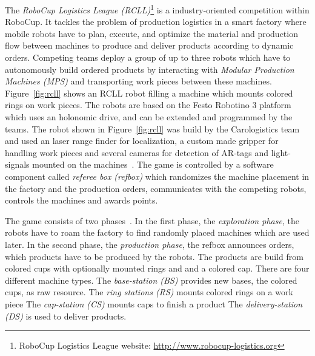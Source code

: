 \documentclass[a4paper,11pt]{article}
\newcommand{\reffig}[1]{Figure~\ref{#1}}
\begin{document}
The \emph{RoboCup Logistics League (RCLL)}\footnote{RoboCup Logistics
  League website: \url{http://www.robocup-logistics.org}}
is a industry-oriented competition within RoboCup.  It tackles
the problem of production logistics in a smart factory where mobile
robots have to plan, execute, and optimize the material and production
flow between machines to produce and deliver products according to
dynamic orders. Competing teams deploy a group of up to three robots
which have to autonomously build ordered products by interacting with
\emph{Modular Production Machines (MPS)} and transporting work pieces
between these machines.  \reffig{fig:rcll} shows an RCLL robot filling
a machine which mounts colored rings on work pieces. The robots are
based on the Festo Robotino 3 platform which uses an holonomic drive,
and can be extended and programmed by the teams. The robot shown in
\reffig{fig:rcll} was build by the Carologistics team and used an
laser range finder for localization, a custom made gripper for
handling work pieces and several cameras for detection of AR-tags and
light-signals mounted on the machines~\cite{Carologistics2015}. The
game is controlled by a software component called \emph{referee box
  (refbox)} which randomizes the machine placement in the factory and
the production orders, communicates with the competing robots,
controls the machines and awards points.

The game consists of two phases~\cite{LLSF-Rules-2015}. In the first
phase, the \emph{exploration phase}, the robots have to roam the
factory to find randomly placed machines which are used later.
%
In the second phase, the \emph{production phase}, the refbox announces
orders, which products have to be produced by the robots. The products
are build from colored cups with optionally mounted rings and and a
colored cap.
There are four different machine
types. The \emph{base-station (BS)} provides new bases, the colored
cups, as raw resource. The \emph{ring stations (RS)} mounts colored
rings on a work piece
The \emph{cap-station (CS)} mounts %
caps to finish a product
The \emph{delivery-station (DS)} is used to deliver products.
\end{document}
